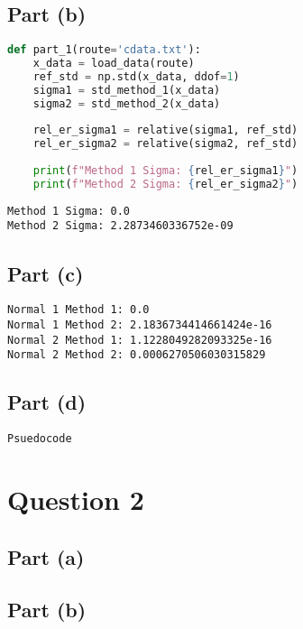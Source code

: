 \documentclass[reprint, amsmath,amssymb, aps]{revtex4-2}
\begin{document}
    \subsection{Part (b)}
\begin{lstlisting}[language=python]
def part_1(route='cdata.txt'):
    x_data = load_data(route)
    ref_std = np.std(x_data, ddof=1)
    sigma1 = std_method_1(x_data)
    sigma2 = std_method_2(x_data)
    
    rel_er_sigma1 = relative(sigma1, ref_std)
    rel_er_sigma2 = relative(sigma2, ref_std)
    
    print(f"Method 1 Sigma: {rel_er_sigma1}")
    print(f"Method 2 Sigma: {rel_er_sigma2}")
\end{lstlisting}

\begin{lstlisting}[style=console]
Method 1 Sigma: 0.0
Method 2 Sigma: 2.2873460336752e-09
\end{lstlisting}

    \subsection{Part (c)}
\begin{lstlisting}[style=console]
Normal 1 Method 1: 0.0
Normal 1 Method 2: 2.1836734414661424e-16
Normal 2 Method 1: 1.1228049282093325e-16
Normal 2 Method 2: 0.0006270506030315829
\end{lstlisting}

    \subsection{Part (d)}
\begin{lstlisting}[style=console]
Psuedocode
\end{lstlisting}


\section{Question 2}
\subsection{Part (a)}

\subsection{Part (b)}
\end{document}
